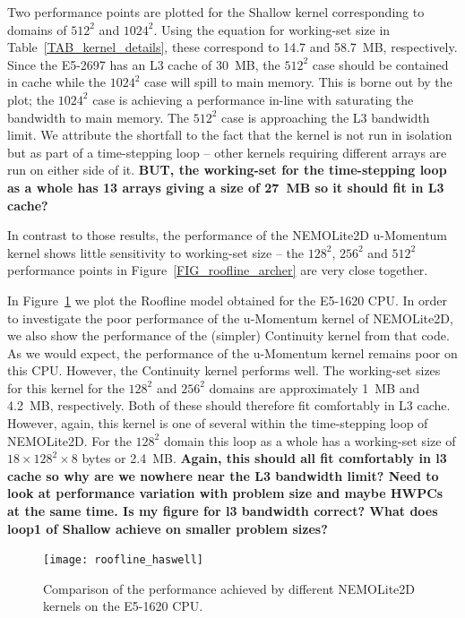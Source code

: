 \documentclass[12pt]{article}
\begin{document}
 Two performance points are plotted for the Shallow kernel
 corresponding to domains of $512^2$ and $1024^2$. Using the equation
 for working-set size in Table~\ref{TAB_kernel_details}, these
 correspond to 14.7 and 58.7~MB, respectively. Since the E5-2697 has
 an L3 cache of 30~MB, the $512^2$ case should be contained in cache
 while the $1024^2$ case will spill to main memory. This is borne out
 by the plot; the $1024^2$ case is achieving a performance in-line
 with saturating the bandwidth to main memory. The $512^2$ case is
 approaching the L3 bandwidth limit. We attribute the shortfall to the
 fact that the kernel is not run in isolation but as part of a
 time-stepping loop -- other kernels requiring different arrays are
 run on either side of it. {\bf BUT, the working-set for the
   time-stepping loop as a whole has 13 arrays giving a size of 27~MB
   so it should fit in L3 cache?}

In contrast to those results, the performance of the NEMOLite2D
u-Momentum kernel shows little sensitivity to working-set size -- the
$128^2$, $256^2$ and $512^2$ performance points in
Figure~\ref{FIG_roofline_archer} are very close together.

In Figure~\ref{FIG_roofline_haswell} we plot the Roofline model
obtained for the E5-1620 CPU. In order to investigate the poor
performance of the u-Momentum kernel of NEMOLite2D, we also show the
performance of the (simpler) Continuity kernel from that code. As we
would expect, the performance of the u-Momentum kernel remains poor on
this CPU. However, the Continuity kernel performs well. The
working-set sizes for this kernel for the $128^2$ and $256^2$ domains
are approximately 1~MB and 4.2~MB, respectively. Both of these should
therefore fit comfortably in L3 cache. However, again, this kernel is
one of several within the time-stepping loop of NEMOLite2D. For the
$128^2$ domain this loop as a whole has a working-set size of
$18\times128^2\times 8$ bytes or 2.4~MB. {\bf Again, this should all
  fit comfortably in l3 cache so why are we nowhere near the L3
  bandwidth limit? Need to look at performance variation with problem size and maybe HWPCs at the same time. Is my figure for l3 bandwidth correct? What does loop1 of Shallow achieve on smaller problem sizes?}

\begin{figure}
\centering
\texttt{[image: roofline\_haswell]}
\caption{Comparison of the performance achieved by different
  NEMOLite2D kernels on the E5-1620 CPU.}
\label{FIG_roofline_haswell}
\end{figure}
\end{document}
